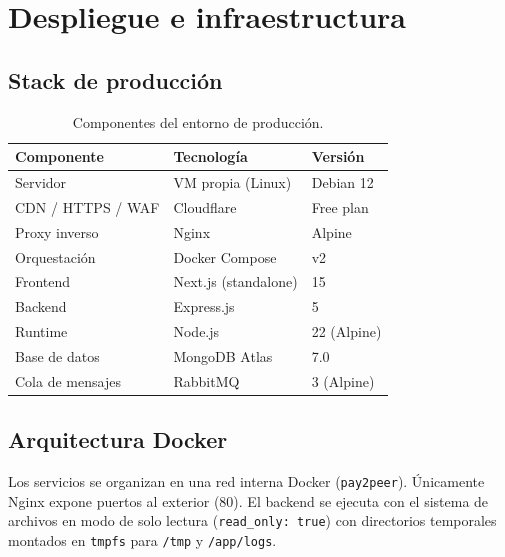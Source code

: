 \chapter{Despliegue e infraestructura}\label{ch:despliegue}

\section{Stack de producción}

\begin{table}[H]
\centering
\caption{Componentes del entorno de producción.}\label{tab:stack}
\begin{tabularx}{\textwidth}{lXl}
\toprule
\textbf{Componente} & \textbf{Tecnología} & \textbf{Versión} \\
\midrule
Servidor         & VM propia (Linux)        & Debian 12   \\
CDN / HTTPS / WAF & Cloudflare              & Free plan   \\
Proxy inverso    & Nginx                    & Alpine      \\
Orquestación     & Docker Compose           & v2          \\
Frontend         & Next.js (standalone)     & 15          \\
Backend          & Express.js               & 5           \\
Runtime          & Node.js                  & 22 (Alpine) \\
Base de datos    & MongoDB Atlas            & 7.0         \\
Cola de mensajes & RabbitMQ                 & 3 (Alpine)  \\
\bottomrule
\end{tabularx}
\end{table}

\section{Arquitectura Docker}

Los servicios se organizan en una red interna Docker (\texttt{pay2peer}). Únicamente Nginx expone puertos al exterior (80). El backend se ejecuta con el sistema de archivos en modo de solo lectura (\texttt{read\_only: true}) con directorios temporales montados en \texttt{tmpfs} para \texttt{/tmp} y \texttt{/app/logs}.

